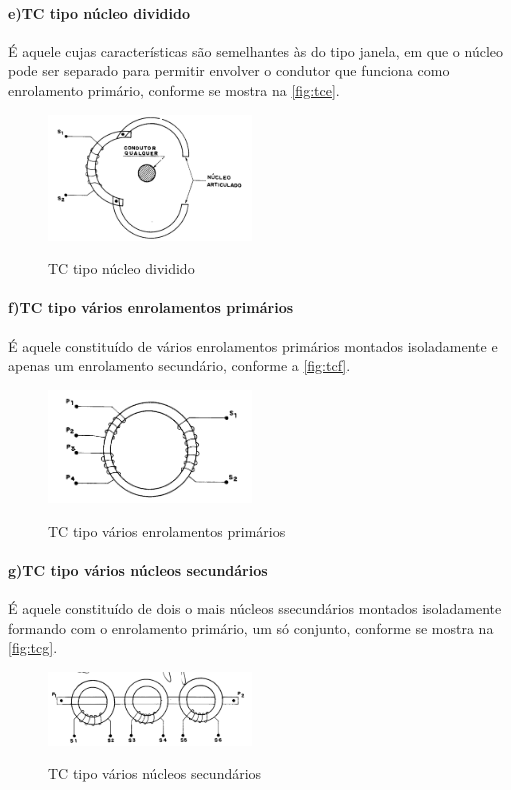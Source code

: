 \documentclass[a5paper,english,spanish,brazil]{ufsc-thesis}
\begin{document}
				\paragraph*{e)\indent TC tipo núcleo dividido}
					É aquele cujas características são semelhantes às do tipo janela, em que o núcleo pode ser separado para permitir envolver o condutor que funciona como enrolamento primário, conforme se mostra na \autoref{fig:tce}.
					\begin{figure}[htb]
						\caption{TC tipo núcleo dividido}
						\centering
						\includegraphics[width=5.4cm]{TC(5).png}
						\label{fig:tce}
					\end{figure}
				\paragraph*{f)\indent TC tipo vários enrolamentos primários}
					É aquele constituído de vários enrolamentos primários montados isoladamente e apenas um enrolamento secundário, conforme a \autoref{fig:tcf}.
					\begin{figure}[htb]
						\caption{TC tipo vários enrolamentos primários}
						\centering
						\includegraphics[width=5.4cm]{TC(6).png}
						\label{fig:tcf}
					\end{figure}
				\paragraph*{g)\indent TC tipo vários núcleos secundários}
					É aquele constituído de dois o mais núcleos ssecundários montados isoladamente formando com o enrolamento primário, um só conjunto, conforme se mostra na \autoref{fig:tcg}.
					\begin{figure}[htb]
						\caption{TC tipo vários núcleos secundários}
						\centering
						\includegraphics[width=5.4cm]{TC(7).png}
						\label{fig:tcg}
					\end{figure}
\end{document}
